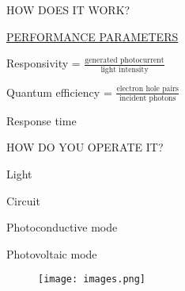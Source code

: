 \documentclass[14pt]{beamer}
\begin{document}
\begin{frame}{HOW DOES IT WORK?}
		
		\begin{flushleft}
		\quad \quad	\underline{PERFORMANCE PARAMETERS}
		\vspace{3mm}
		\begin{list}{-}{}
			\item Responsivity = $\frac{\text{generated photocurrent}}{\text{light intensity}}$
			\vspace{1mm}
			\item Quantum efficiency = $\frac{\text{electron hole pairs}}{\text{incident photons}}$
			\vspace{1mm}
			\item Response time 
 
		\end{list}
	\end{flushleft}	
	\vspace{5mm}
	
\end{frame}



\begin{frame}{HOW DO YOU OPERATE IT?}
	
		\begin{flushleft}
		\begin{list}{--}{}
			\item Light 
			\item Circuit 
			\item Photoconductive mode
			\item Photovoltaic mode 
		\end{list}
	\end{flushleft}	

	\begin{figure}[H]
	\begin{flushleft}
		\texttt{[image: images.png]}
	\end{flushleft}
\end{figure}
	
\end{frame}
\end{document}
